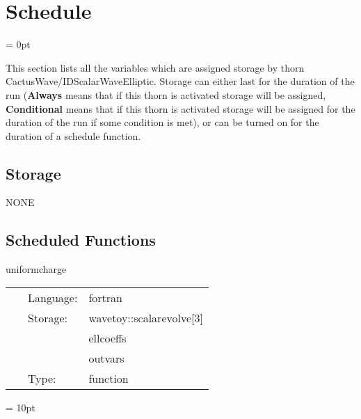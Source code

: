 
\section{Schedule} 


\parskip = 0pt


\noindent This section lists all the variables which are assigned storage by thorn CactusWave/IDScalarWaveElliptic.  Storage can either last for the duration of the run ({\bf Always} means that if this thorn is activated storage will be assigned, {\bf Conditional} means that if this thorn is activated storage will be assigned for the duration of the run if some condition is met), or can be turned on for the duration of a schedule function.


\subsection*{Storage}NONE
\subsection*{Scheduled Functions}
\vspace{5mm}


\hspace{5mm} uniformcharge 

\hspace{5mm}{\it initial data (uniform charge) for 3d wave equation } 


\hspace{5mm}

 \begin{tabular*}{160mm}{cll} 
~ & Language:  & fortran \\ 
~ & Storage:  & wavetoy::scalarevolve[3] \\ 
~& ~ &ellcoeffs\\ 
~& ~ &outvars\\ 
~ & Type:  & function \\ 
\end{tabular*} 



\vspace{5mm}\parskip = 10pt 
